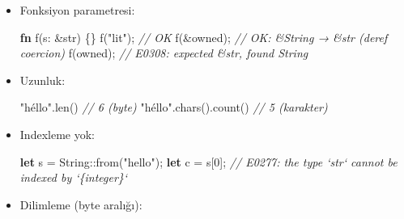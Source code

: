 \documentclass[12pt,a4paper]{article}
\newenvironment{Shaded}{}{}
\newcommand{\CommentTok}[1]{\textcolor[rgb]{0.38,0.63,0.69}{\textit{#1}}}
\newcommand{\DataTypeTok}[1]{\textcolor[rgb]{0.56,0.13,0.00}{#1}}
\newcommand{\DecValTok}[1]{\textcolor[rgb]{0.25,0.63,0.44}{#1}}
\newcommand{\FunctionTok}[1]{\textcolor[rgb]{0.02,0.16,0.49}{#1}}
\newcommand{\KeywordTok}[1]{\textcolor[rgb]{0.00,0.44,0.13}{\textbf{#1}}}
\newcommand{\NormalTok}[1]{#1}
\newcommand{\OperatorTok}[1]{\textcolor[rgb]{0.40,0.40,0.40}{#1}}
\newcommand{\StringTok}[1]{\textcolor[rgb]{0.25,0.44,0.63}{#1}}
\begin{document}
\begin{itemize}
\begin{Shaded}
\begin{Highlighting}[]
\KeywordTok{let}\NormalTok{ s3 }\OperatorTok{=}\NormalTok{ s1 }\OperatorTok{+} \OperatorTok{\&}\NormalTok{s2}\OperatorTok{;}                  \CommentTok{// s1 TAŞINIR, s2 kalır}
\KeywordTok{let}\NormalTok{ s4 }\OperatorTok{=}\NormalTok{ format}\OperatorTok{!(}\StringTok{"\{s2\}-\{s3\}"}\OperatorTok{);}      \CommentTok{// hiçbiri taşınmaz}
\end{Highlighting}
\end{Shaded}


  Hata: \texttt{s1} sonra kullanılırsa → \texttt{E0382}: borrow of moved value
  Hata: \texttt{"a"\ +\ "b"} → \texttt{E0369}: cannot add \texttt{\&str} to \texttt{\&str}
\item
  Fonksiyon parametresi:

\begin{Shaded}
\begin{Highlighting}[]
\KeywordTok{fn} \FunctionTok{f}\OperatorTok{(}\NormalTok{s}\OperatorTok{:} \OperatorTok{\&}\DataTypeTok{str}\OperatorTok{)} \OperatorTok{\{\}}
\FunctionTok{f}\OperatorTok{(}\StringTok{"lit"}\OperatorTok{);}        \CommentTok{// OK}
\FunctionTok{f}\OperatorTok{(\&}\NormalTok{owned}\OperatorTok{);}       \CommentTok{// OK: \&String → \&str (deref coercion)}
\FunctionTok{f}\OperatorTok{(}\NormalTok{owned}\OperatorTok{);}        \CommentTok{// E0308: expected \&str, found String}
\end{Highlighting}
\end{Shaded}
\item
  Uzunluk:

\begin{Shaded}
\begin{Highlighting}[]
\StringTok{"héllo"}\OperatorTok{.}\FunctionTok{len}\OperatorTok{()}              \CommentTok{// 6  (byte)}
\StringTok{"héllo"}\OperatorTok{.}\FunctionTok{chars}\OperatorTok{().}\FunctionTok{count}\OperatorTok{()}    \CommentTok{// 5  (karakter)}
\end{Highlighting}
\end{Shaded}
\item
  Indexleme yok:

\begin{Shaded}
\begin{Highlighting}[]
\KeywordTok{let}\NormalTok{ s }\OperatorTok{=} \DataTypeTok{String}\OperatorTok{::}\FunctionTok{from}\OperatorTok{(}\StringTok{"hello"}\OperatorTok{);}
\KeywordTok{let}\NormalTok{ c }\OperatorTok{=}\NormalTok{ s}\OperatorTok{[}\DecValTok{0}\OperatorTok{];}     \CommentTok{// E0277: the type `str` cannot be indexed by `\{integer\}`}
\end{Highlighting}
\end{Shaded}
\item
  Dilimleme (byte aralığı):


\end{itemize}
\end{document}
